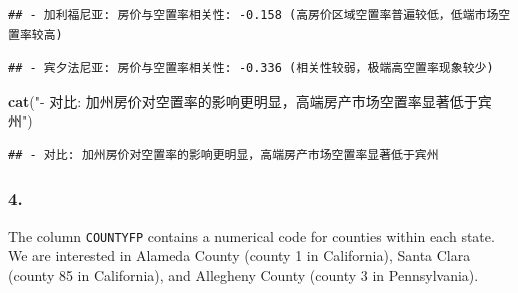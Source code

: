 \documentclass[
]{article}
\newenvironment{Shaded}{\begin{snugshade}}{\end{snugshade}}
\newcommand{\DecValTok}[1]{\textcolor[rgb]{0.00,0.00,0.81}{#1}}
\newcommand{\FunctionTok}[1]{\textcolor[rgb]{0.13,0.29,0.53}{\textbf{#1}}}
\newcommand{\NormalTok}[1]{#1}
\newcommand{\SpecialCharTok}[1]{\textcolor[rgb]{0.81,0.36,0.00}{\textbf{#1}}}
\newcommand{\StringTok}[1]{\textcolor[rgb]{0.31,0.60,0.02}{#1}}
\begin{document}
\begin{Shaded}
\end{Shaded}

\begin{verbatim}
## - 加利福尼亚: 房价与空置率相关性: -0.158 (高房价区域空置率普遍较低，低端市场空置率较高)
\end{verbatim}

\begin{Shaded}
\end{Shaded}

\begin{verbatim}
## - 宾夕法尼亚: 房价与空置率相关性: -0.336 (相关性较弱，极端高空置率现象较少)
\end{verbatim}

\begin{Shaded}
\begin{Highlighting}[]
\FunctionTok{cat}\NormalTok{(}\StringTok{"{-} 对比: 加州房价对空置率的影响更明显，高端房产市场空置率显著低于宾州"}\NormalTok{)}
\end{Highlighting}
\end{Shaded}

\begin{verbatim}
## - 对比: 加州房价对空置率的影响更明显，高端房产市场空置率显著低于宾州
\end{verbatim}

\subsubsection{4.}\label{section}

The column \texttt{COUNTYFP} contains a numerical code for counties
within each state. We are interested in Alameda County (county 1 in
California), Santa Clara (county 85 in California), and Allegheny County
(county 3 in Pennsylvania).
\end{document}
